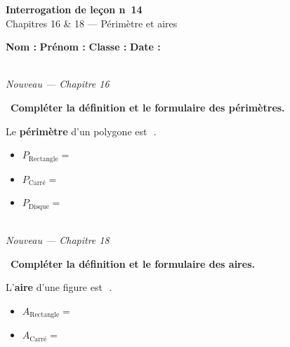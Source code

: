 \documentclass[a4paper,11pt]{article}
\newcommand{\bl}[1][4cm]{\,\makebox[#1]{\dotfill}\,}
\newcommand{\coeur}{\textcolor{Couleur8}{\faHeart}\ }
\begin{document}
\begin{mdframed}[linecolor=Couleur1,linewidth=2pt,topline=true,bottomline=true,leftline=false,rightline=false,innertopmargin=8pt,innerbottommargin=8pt,backgroundcolor=Couleur1!5]
\begin{center}
{\Large\bfseries\textcolor{Couleur1}{Interrogation de le\c{c}on n\degre~14}}\\[4pt]
{\large\textcolor{Couleur8}{Chapitres 16 \& 18 --- P\'erim\`etre et aires}}
\end{center}
\end{mdframed}
\vspace{0.4cm}
\noindent\textbf{Nom :} \dotfill\quad\textbf{Pr\'enom :} \dotfill\quad\textbf{Classe :} \dotfill\quad\textbf{Date :} \dotfill
\vspace{0.5cm}

\vspace{0.3cm}
\noindent{\textcolor{Couleur8}{\rule{\textwidth}{0.5pt}}}\\
{\small\textit{\textcolor{Couleur8}{Nouveau --- Chapitre 16}}}
\vspace{0.1cm}

\noindent \coeur \textbf{Compl\'eter la d\'efinition et le formulaire des p\'erim\`etres.}
\begin{mdframed}[linecolor=Couleur6,linewidth=4pt,topline=false,bottomline=false,rightline=false,backgroundcolor=Couleur6!10,innerleftmargin=8pt,innertopmargin=6pt,innerbottommargin=6pt]
Le \textbf{p\'erim\`etre} d'un polygone est \bl[7cm].\\[6pt]
\begin{itemize}[label=\textcolor{Couleur6}{$\bullet$},nosep,itemsep=4pt]
\item $P_{\text{Rectangle}} = $ \bl[6cm]
\item $P_{\text{Carr\'e}} = $ \bl[4cm]
\item $P_{\text{Disque}} = $ \bl[6cm]
\end{itemize}
\end{mdframed}

\vspace{0.3cm}
\noindent{\textcolor{Couleur8}{\rule{\textwidth}{0.5pt}}}\\
{\small\textit{\textcolor{Couleur8}{Nouveau --- Chapitre 18}}}
\vspace{0.1cm}

\noindent \coeur \textbf{Compl\'eter la d\'efinition et le formulaire des aires.}
\begin{mdframed}[linecolor=Couleur6,linewidth=4pt,topline=false,bottomline=false,rightline=false,backgroundcolor=Couleur6!10,innerleftmargin=8pt,innertopmargin=6pt,innerbottommargin=6pt]
L'\textbf{aire} d'une figure est \bl[6cm].\\[6pt]
\begin{itemize}[label=\textcolor{Couleur6}{$\bullet$},nosep,itemsep=4pt]
\item $A_{\text{Rectangle}} = $ \bl[4cm]
\item $A_{\text{Carr\'e}} = $ \bl[4cm]
\end{itemize}
\end{mdframed}
\end{document}
